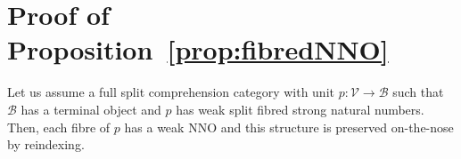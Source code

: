 \section{Proof of Proposition~\ref{prop:fibredNNO}}
\label{sect:proofofprop:fibredNNO}

{
\renewcommand{\thetheorem}{\ref{prop:fibredNNO}}
\begin{proposition}
Let us assume a full split comprehension category with unit \linebreak $p : \mathcal{V} \longrightarrow \mathcal{B}$ such that $\mathcal{B}$ has a terminal object and $p$ has weak split fibred strong 
natural numbers. Then, each fibre of $p$ has a weak NNO and this structure is preserved on-the-nose by reindexing.
\end{proposition}
\addtocounter{theorem}{-1}
}

